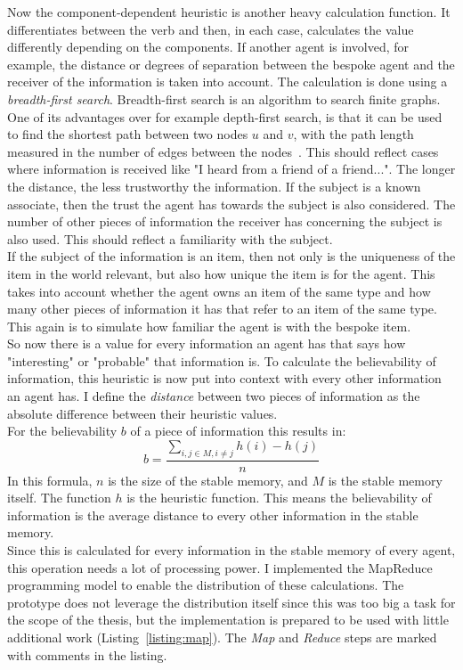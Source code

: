 Now the component-dependent heuristic is another heavy calculation function. It differentiates between the verb and then, in each case, calculates the value differently depending on the components. If another agent is involved, for example, the distance or degrees of separation between the bespoke agent and the receiver of the information is taken into account. The calculation is done using a \textit{breadth-first search}. Breadth-first search is an algorithm to search finite graphs. One of its advantages over for example depth-first search, is that it can be used to find the shortest path between two nodes $u$ and $v$, with the path length measured in the number of edges between the nodes~\cite{Bundy1984}. This should reflect cases where information is received like "I heard from a friend of a friend...". The longer the distance, the less trustworthy the information. If the subject is a known associate, then the trust the agent has towards the subject is also considered. The number of other pieces of information the receiver has concerning the subject is also used. This should reflect a familiarity with the subject.\\
If the subject of the information is an item, then not only is the uniqueness of the item in the world relevant, but also how unique the item is for the agent. This takes into account whether the agent owns an item of the same type and how many other pieces of information it has that refer to an item of the same type. This again is to simulate how familiar the agent is with the bespoke item.\\
So now there is a value for every information an agent has that says how "interesting" or "probable" that information is. To calculate the believability of information, this heuristic is now put into context with every other information an agent has. I define the \textit{distance} between two pieces of information as the absolute difference between their heuristic values.\\
For the believability $b$ of a piece of information this results in:
\begin{equation*}
	b = \frac{\sum_{i,j \in M, i \neq j} h(i)-h(j)}{n}
\end{equation*}
In this formula, $n$ is the size of the stable memory, and $M$ is the stable memory itself. The function $h$ is the heuristic function. This means the believability of information is the average distance to every other information in the stable memory.\\
Since this is calculated for every information in the stable memory of every agent, this operation needs a lot of processing power. I implemented the MapReduce programming model to enable the distribution of these calculations. The prototype does not leverage the distribution itself since this was too big a task for the scope of the thesis, but the implementation is prepared to be used with little additional work (Listing~\ref{listing:map}). The \textit{Map} and \textit{Reduce} steps are marked with comments in the listing.

